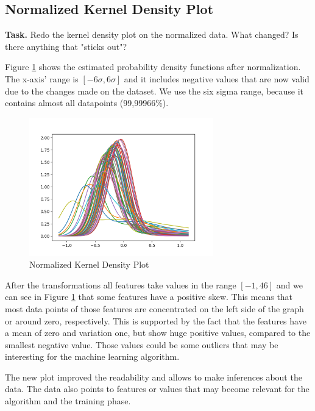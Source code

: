 \documentclass{support/acm_proc_article-sp}
\begin{document}

    \subsection{Normalized Kernel Density Plot}
    \vspace{\baselineskip}

    \textbf{Task.} Redo the kernel density plot on the normalized data.
    What changed?
    Is there anything that "sticks out"?

    Figure \ref{fig:normalized-kernel-density-plot} shows the estimated probability density functions after normalization.
    The x-axis' range is $[-6\sigma, 6\sigma]$ and it includes negative values that are now valid due to the changes
    made on the dataset.
    We use the six sigma range, because it contains almost all datapoints (99,99966\%).
    \begin{figure}[!htbp]
        \centering
        \includegraphics[width=8cm]{images/normalized-kdp.png}
        \caption{Normalized Kernel Density Plot}
        \label{fig:normalized-kernel-density-plot}
    \end{figure}
    After the transformations all features take values in the range $[-1, 46]$ and we can see in Figure \ref{fig:normalized-kernel-density-plot}
    that some features have a positive skew.
    This means that most data points of those features are concentrated on the left side of the graph or around zero, respectively.
    This is supported by the fact that the features have a mean of zero and variation one, but show huge positive values,
    compared to the smallest negative value.
    Those values could be some outliers that may be interesting for the machine learning algorithm.

    The new plot improved the readability and allows to make inferences about the data.
    The data also points to features or values that may become relevant for the algorithm and the training phase.
\end{document}
